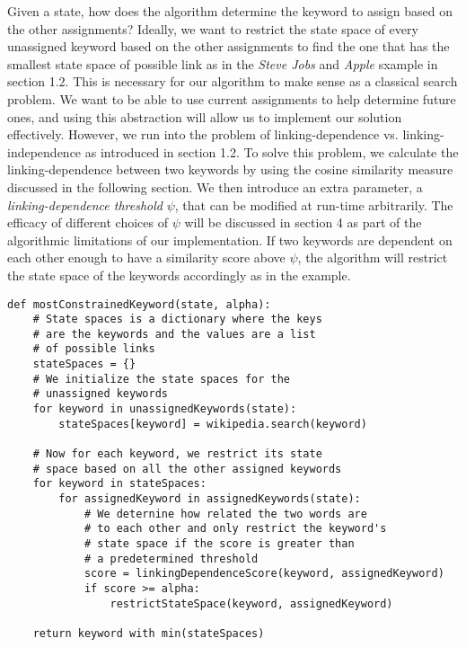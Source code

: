 \documentclass[twoside,11pt]{article}
\begin{document}
Given a state, how does the algorithm determine the keyword to assign based on the other assignments? Ideally, we want to restrict the state space of every unassigned keyword based on the other assignments to find the one that has the smallest state space of possible link as in the \textit{Steve Jobs} and \textit{Apple} sxample in section 1.2. This is necessary for our algorithm to make sense as a classical search problem. We want to be able to use current assignments to help determine future ones, and using this abstraction will allow us to implement our solution effectively. However, we run into the problem of linking-dependence vs. linking-independence as introduced in section 1.2. To solve this problem, we calculate the linking-dependence between two keywords by using the cosine similarity measure discussed in the following section. We then introduce an extra parameter, a \textit{linking-dependence threshold} $\psi$, that can be modified at run-time arbitrarily. The efficacy of different choices of $\psi$ will be discussed in section 4 as part of the algorithmic limitations of our implementation. If two keywords are dependent on each other enough to have a similarity score above $\psi$, the algorithm will restrict the state space of the keywords accordingly as in the example.

\begin{lstlisting}
def mostConstrainedKeyword(state, alpha):
    # State spaces is a dictionary where the keys
    # are the keywords and the values are a list
    # of possible links
    stateSpaces = {}
    # We initialize the state spaces for the
    # unassigned keywords
    for keyword in unassignedKeywords(state):
        stateSpaces[keyword] = wikipedia.search(keyword)

    # Now for each keyword, we restrict its state
    # space based on all the other assigned keywords
    for keyword in stateSpaces:
        for assignedKeyword in assignedKeywords(state):
            # We deternine how related the two words are
            # to each other and only restrict the keyword's
            # state space if the score is greater than
            # a predetermined threshold
            score = linkingDependenceScore(keyword, assignedKeyword)
            if score >= alpha:
                restrictStateSpace(keyword, assignedKeyword)

    return keyword with min(stateSpaces)
\end{lstlisting}
\end{document}
